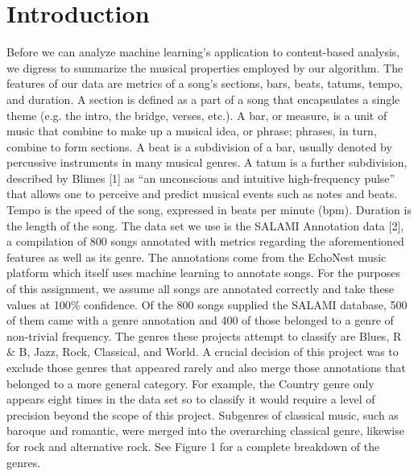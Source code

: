 \documentclass[11pt, twocolumn]{article}
\begin{document}
\section{Introduction}
    Before we can analyze machine learning’s application to content-based analysis, we digress to summarize the musical properties employed by our algorithm. The features of our data are metrics of a song’s sections, bars, beats, tatums, tempo, and duration. A section is defined as a part of a song that encapsulates a single theme (e.g. the intro, the bridge, verses, etc.). A bar, or measure, is a unit of music that combine to make up a musical idea, or phrase; phrases, in turn, combine to form sections. A beat is a subdivision of a bar, usually denoted by percussive instruments in many musical genres. A tatum is a further subdivision, described by Blimes [1] as “an unconscious and intuitive high-frequency pulse” that allows one to perceive and predict musical events such as notes and beats. Tempo is the speed of the song, expressed in beats per minute (bpm). Duration is the length of the song.
    The data set we use is the SALAMI Annotation data [2], a compilation of 800 songs annotated with metrics regarding the aforementioned features as well as its genre. The annotations come from the EchoNest music platform which itself uses machine learning to annotate songs. For the purposes of this assignment, we assume all songs are annotated correctly and take these values at 100\% confidence.
    Of the 800 songs supplied the SALAMI database, 500 of them came with a genre  annotation and 400 of those belonged to a genre of non-trivial frequency. The genres these projects attempt to classify are Blues, R \& B, Jazz, Rock, Classical, and World. A crucial decision of this project was to exclude those genres that appeared rarely and also merge those annotations that belonged to a more general category. For example, the Country genre only appears eight times in the data set so to classify it would require a level of precision beyond the scope of this project. Subgenres of classical music, such as baroque and romantic, were merged into the overarching classical genre, likewise for rock and alternative rock. See Figure 1 for a complete breakdown of the genres.
\end{document}
